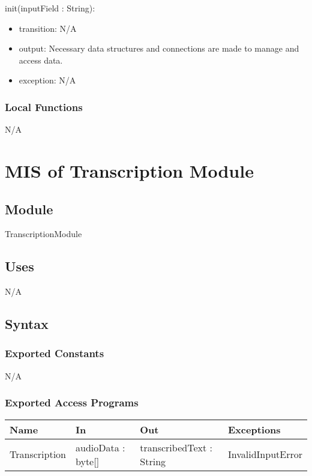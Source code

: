 \documentclass[12pt, titlepage]{article}
\begin{document}
\noindent init(inputField : String):
\begin{itemize}
\item transition: N/A
\item output: Necessary data structures and connections are made to manage and access data.
\item exception: N/A
\end{itemize}

\subsubsection{Local Functions}

N/A

\newpage

  
\section{MIS of Transcription Module} \label{Transcription_Module}

\subsection{Module}
TranscriptionModule

\subsection{Uses}

N/A

\subsection{Syntax}

\subsubsection{Exported Constants}

N/A

\subsubsection{Exported Access Programs}

\begin{center}
\begin{tabular}{p{3cm} p{4cm} p{4cm} p{3cm}}
\hline
\textbf{Name} & \textbf{In} & \textbf{Out} & \textbf{Exceptions} \\
\hline
Transcription & audioData : byte[] & transcribedText : String & InvalidInputError \\ 
\hline
\end{tabular}
\end{center}
\end{document}
